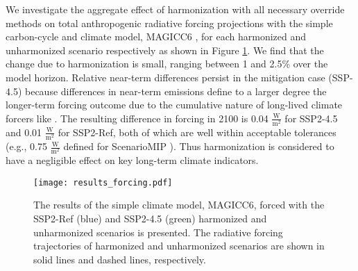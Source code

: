 We investigate the aggregate effect of harmonization with all necessary override
methods on total anthropogenic radiative forcing projections with the simple
carbon-cycle and climate model, MAGICC6 \cite{meinshausen2011emulating,
  meinshausen2011rcp}, for each harmonized and unharmonized scenario
respectively as shown in Figure \ref{fig:forcing}. We find that the change due
to harmonization is small, ranging between 1 and 2.5\% over the model
horizon. Relative near-term differences persist in the mitigation case (SSP-4.5)
because differences in near-term emissions define to a larger degree the
longer-term forcing outcome due to the cumulative nature of long-lived climate
forcers like \cotwo.  The resulting difference in forcing in 2100 is 0.04
$\frac{\text{W}}{\text{m}^2}$ for SSP2-4.5 and 0.01
$\frac{\text{W}}{\text{m}^2}$ for SSP2-Ref, both of which are well within
acceptable tolerances (e.g., 0.75 $\frac{\text{W}}{\text{m}^2}$ defined for
ScenarioMIP \cite{oneill_scenario_2016}). Thus harmonization is considered to
have a negligible effect on key long-term climate indicators.

\begin{figure}
  \begin{center}
    \texttt{[image: results\_forcing.pdf]}
    \caption[]{
      \label{fig:forcing}
      The results of the simple climate model, MAGICC6, forced with the SSP2-Ref
      (blue) and SSP2-4.5 (green) harmonized and unharmonized scenarios is
      presented. The radiative forcing trajectories of harmonized and
      unharmonized scenarios are shown in solid lines and dashed lines,
      respectively.  }
  \end{center}
\end{figure}
